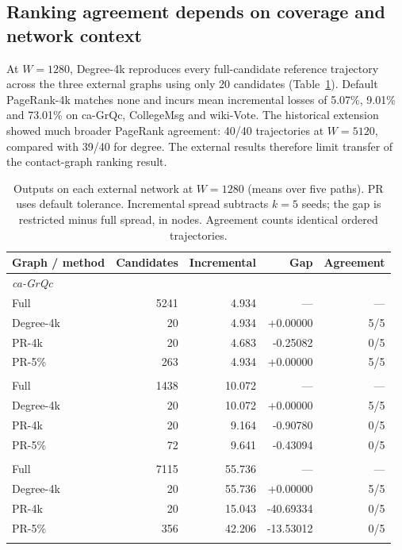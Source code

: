 \documentclass[smallextended]{svjour3}
\newcommand{\CollegePRLoss}{9.01}
\newcommand{\GrqcPRLoss}{5.07}
\newcommand{\WikiPRLoss}{73.01}
\begin{document}
\subsection{Ranking agreement depends on coverage and network context}
At $W=1280$, Degree-4k reproduces every full-candidate reference trajectory across the three external graphs using only 20 candidates (Table~\ref{tab:primary}). Default PageRank-4k matches none and incurs mean incremental losses of \GrqcPRLoss{}\%, \CollegePRLoss{}\% and \WikiPRLoss{}\% on ca-GrQc, CollegeMsg and wiki-Vote. The historical extension showed much broader PageRank agreement: 40/40 trajectories at $W=5120$, compared with 39/40 for degree. The external results therefore limit transfer of the contact-graph ranking result.
\begin{table}[htbp]
\caption{Outputs on each external network at $W=1280$ (means over five paths). PR uses default tolerance. Incremental spread subtracts $k=5$ seeds; the gap is restricted minus full spread, in nodes. Agreement counts identical ordered trajectories.}\label{tab:primary}
\centering\begin{tabular}{lrrrr}\toprule
Graph / method & Candidates & Incremental & Gap & Agreement \\ \midrule
\multicolumn{5}{l}{\textit{ca-GrQc}} \\
Full & 5241 & 4.934 & --- & --- \\
Degree-4k & 20 & 4.934 & +0.00000 & 5/5 \\
PR-4k & 20 & 4.683 & -0.25082 & 0/5 \\
PR-5\% & 263 & 4.934 & +0.00000 & 5/5 \\
\addlinespace
\multicolumn{5}{l}{\textit{CollegeMsg}} \\
Full & 1438 & 10.072 & --- & --- \\
Degree-4k & 20 & 10.072 & +0.00000 & 5/5 \\
PR-4k & 20 & 9.164 & -0.90780 & 0/5 \\
PR-5\% & 72 & 9.641 & -0.43094 & 0/5 \\
\addlinespace
\multicolumn{5}{l}{\textit{wiki-Vote}} \\
Full & 7115 & 55.736 & --- & --- \\
Degree-4k & 20 & 55.736 & +0.00000 & 5/5 \\
PR-4k & 20 & 15.043 & -40.69334 & 0/5 \\
PR-5\% & 356 & 42.206 & -13.53012 & 0/5 \\
\addlinespace
\bottomrule\end{tabular}
\end{table}
\end{document}
